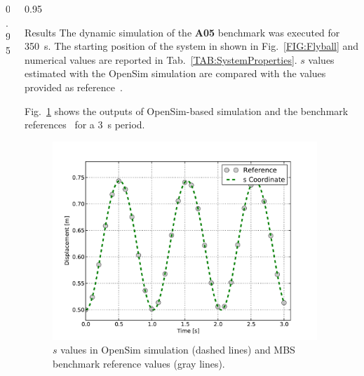 \documentclass[final]{beamer}
\newlength{\onecolwid}
\newlength{\twocolwid}
\begin{document}
\begin{frame}[t]
\begin{columns}[t]
\begin{column}{\twocolwid}
\begin{columns}[t, totalwidth=\twocolwid]
\begin{column}{0.95\onecolwid}
\end{column}

\begin{column}{0.95\onecolwid}


\begin{block}{Results}
The dynamic simulation of the \textbf{A05} benchmark was executed for \SI{350}{\second}.
The starting position of the system in shown in Fig.~\ref{FIG:Flyball} and numerical values are reported in Tab.~\ref{TAB:SystemProperties}.
$s$ values estimated with the OpenSim simulation are compared with the values provided as reference~\cite{gonzalez2006benchmarking}.  

Fig.~\ref{FIG:simulationPlot} shows the outputs of OpenSim-based simulation and the benchmark references~\cite{gonzalez2006benchmarking} for a \SI{3}{\second} period.

  

\begin{figure}[h]
\centering
\includegraphics[width=0.95\textwidth]{5MBS_PlotResults.pdf}
\caption{$s$ values in OpenSim simulation
(dashed lines) and MBS benchmark reference values (gray lines).}
\label{FIG:simulationPlot}
\end{figure}

\end{block}

\end{column}
  
\end{columns}



\end{column}
\end{columns}
\end{frame}
\end{document}
